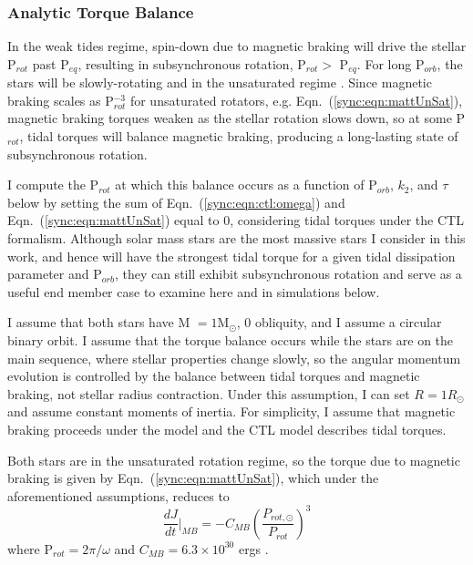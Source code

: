 \subsubsection{Analytic Torque Balance} \label{sync:sec:analytic}

In the weak tides regime, spin-down due to magnetic braking will drive the stellar P$_{rot}$ past P$_{eq}$, resulting in subsynchronous rotation, P$_{rot} >$ P$_{eq}$. For long P$_{orb}$, the stars will be slowly-rotating and in the unsaturated regime \citep{Matt2015}. Since magnetic braking scales as P$_{rot}^{-3}$ for unsaturated rotators, e.g. Eqn.~(\ref{sync:eqn:mattUnSat}), magnetic braking torques weaken as the stellar rotation slows down, so at some P$_{rot}$, tidal torques will balance magnetic braking, producing a long-lasting state of subsynchronous rotation. 

I compute the P$_{rot}$ at which this balance occurs as a function of P$_{orb}$, $k_2$, and $\tau$ below by setting the sum of Eqn.~(\ref{sync:eqn:ctl:omega}) and Eqn.~(\ref{sync:eqn:mattUnSat}) equal to 0, considering tidal torques under the CTL formalism.  Although solar mass stars are the most massive stars I consider in this work, and hence will have the strongest tidal torque for a given tidal dissipation parameter and P$_{orb}$, they can still exhibit subsynchronous rotation and serve as a useful end member case to examine here and in simulations below.

I assume that both stars have M $= 1$M$_{\odot}$, 0 obliquity, and I assume a circular binary orbit. I assume that the torque balance occurs while the stars are on the main sequence, where stellar properties change slowly, so the angular momentum evolution is controlled by the balance between tidal torques and magnetic braking, not stellar radius contraction. Under this assumption, I can set $R = 1 R_{\odot}$ and assume constant moments of inertia. For simplicity, I assume that magnetic braking proceeds under the \citet{Matt2015} model and the CTL model describes tidal torques.

Both stars are in the unsaturated rotation regime, so the torque due to magnetic braking is given by Eqn.~(\ref{sync:eqn:mattUnSat}), which under the aforementioned assumptions, reduces to
\begin{equation}
    \frac{dJ}{dt}\Bigg|_{MB} = -C_{MB} \left( \frac{P_{rot,\odot}}{P_{rot}} \right)^3
\end{equation}
where P$_{rot} = 2 \pi / \omega$ and $C_{MB} = 6.3 \times 10^{30}$ ergs \citep{Matt2015,Matt2019}.

